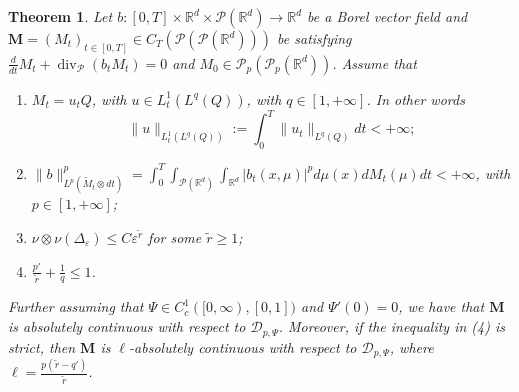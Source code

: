 \documentclass[10pt,leqno]{amsart}
\numberwithin{equation}{section}
\newtheorem{teorema}{Theorem}[section]
\newcommand{\R}{\mathbb{R}}
\newcommand{\Q}{\mathbb{Q}}
\newcommand{\PP}{\mathcal{P}}
\renewcommand{\Q}{Q}
\begin{document}
\iffalse
\begin{teorema}
    Let $b:[0,T]\times \R^d \times \PP(\R^d)\to \R^d$ be a Borel vector field and $\boldsymbol{M}=(M_t)_{t\in[0,T]}\in C_T(\PP(\PP(\R^d)))$ be satisfying $\frac{d}{dt}M_t + \operatorname{div}_\PP (b_t M_t)=0$ and $M_0 \in \PP_p(\PP_p(\R^d))$.
    Assume that 
    \begin{enumerate}
        \item $M_t = u_t \Q$, with $u \in L^1_t(L^q(\Q))$, with $q\in[1,+\infty]$. In other words 
        \begin{equation}
           \|u\|_{L^1_t(L^q(\Q))}:= \int_0^T \|u_t\|_{L^{q}(\Q)} dt <+\infty;
        \end{equation}
        \item $\|b\|_{L^p(\tilde{M}_t\otimes dt)}^p=\int_0^T \int_{\PP(\R^d)} \int_{\R^d} |b_t(x,\mu)|^p d\mu(x) dM_t(\mu) dt<+\infty$, with $p\in[1,+\infty]$;
        \item $\nu\otimes \nu(\Delta_\varepsilon) \leq C \varepsilon^{\tilde{r}}$ for some $\tilde{r}\geq 1$;
        \item $\frac{p'}{\tilde{r}}+\frac{1}{q}\leq1$.
    \end{enumerate}
    Further assuming that $\Psi\in C_c^1([0,\infty),[0,1])$ and $\Psi'(0) = 0$, we have that $\boldsymbol{M}$ is absolutely continuous with respect to $\mathcal{D}_{p,\Psi}$. Moreover, if the inequality in (4) is strict, then $\boldsymbol{M}$ is $\ell$-absolutely continuous with respect to $\mathcal{D}_{p,\Psi}$, where $\ell = \frac{p(\tilde{r}-q')}{\tilde{r}}$.
\end{teorema}
\end{document}
